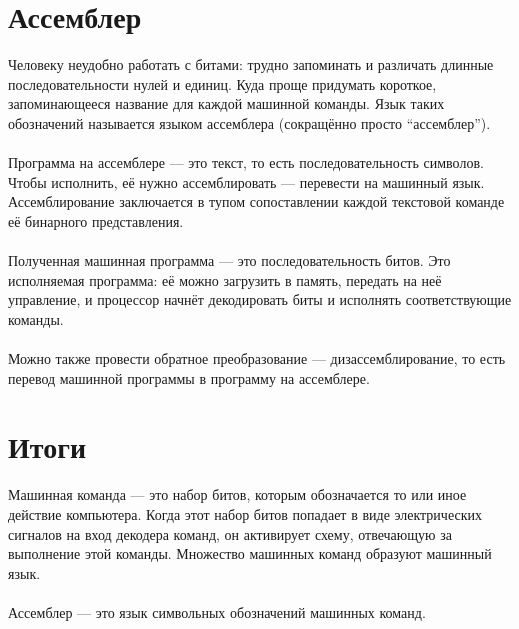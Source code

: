 \documentclass[11pt]{book}
\begin{document}
\section{Ассемблер}
Человеку неудобно работать с битами: трудно запоминать и различать длинные последовательности нулей и единиц.
Куда проще придумать короткое, запоминающееся название для каждой машинной команды.
Язык таких обозначений называется языком ассемблера (сокращённо просто ``ассемблер'').
\\ \\
Программа на ассемблере --- это текст, то есть последовательность символов.
Чтобы исполнить, её нужно ассемблировать --- перевести на машинный язык.
Ассемблирование заключается в тупом сопоставлении каждой текстовой команде её бинарного представления.
\\ \\
Полученная машинная программа --- это последовательность битов.
Это исполняемая программа: её можно загрузить в память, передать на неё управление,
и процессор начнёт декодировать биты и исполнять соответствующие команды.
\\ \\
Можно также провести обратное преобразование --- дизассемблирование,
то есть перевод машинной программы в программу на ассемблере.

\section{Итоги}
Машинная команда --- это набор битов, которым обозначается то или иное действие компьютера.
Когда этот набор битов попадает в виде электрических сигналов на вход декодера команд,
он активирует схему, отвечающую за выполнение этой команды.
Множество машинных команд образуют машинный язык.
\\ \\
Ассемблер --- это язык символьных обозначений машинных команд.
\end{document}
